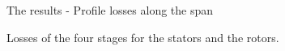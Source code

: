 \documentclass{beamer}
\begin{document}
\begin{frame}[t]{The results - Profile losses along the span}
\begin{center}
Losses of the four stages for the stators and the rotors.
\end{center}
\vspace{-0.4cm}
\begin{figure}%
    \centering
\end{figure}
\end{frame}
\end{document}
